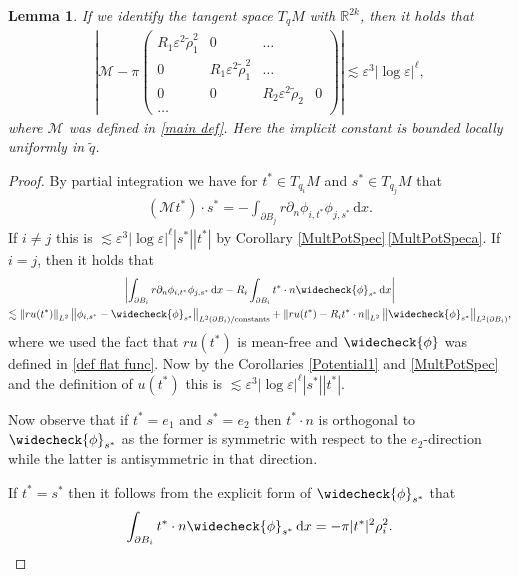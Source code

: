 \documentclass[JEP,XML,SOM,Unicode,published]{cedram}
\let\epsilon\varepsilon
\newcommand{\constants}{\textup{constants}}
\newtheorem{lemma}[theorem]{Lemma}
\theoremstyle{definition}
\newcommand\R{\mathbb{R}}
\newcommand\norm[1]{\left\lVert #1\right\rVert}
\newcommand\bnorm[1]{\bigl\lVert #1\bigr\rVert}
\newcommand\eq{=}
\newcommand\dd{\,\mathrm{d}}
\newcommand\dx{\dd x}
\let\chek\widecheck
\let\de\partial
\let\eps\epsilon
\begin{document}
\begin{lemma}\label{conv Inertia}
If we identify the tangent space $T_qM$ with $\R^{2k}$, then it holds that
\begin{align*}
\left|\mathcal{M}-\pi\begin{pmatrix}R_1\eps^2\tilde{\rho}_1^2 &0 &\dots\\0& R_1\eps^2\tilde{\rho}_1^2& \dots\\0& 0 & R_2\eps^2\tilde{\rho}_2 &0\\
\dots\end{pmatrix}\right|\lesssim \eps^3|{\log\eps}|^\ell,
\end{align*}
where $\mathcal{M}$ was defined in \ref{main def}.
Here the implicit constant is bounded locally uniformly in $\tilde{q}$.
\end{lemma}
\begin{proof}
By partial integration we have for $t^*\in T_{q_i}M$ and $s^*\in T_{q_j}M$ that
\begin{align*}
(\mathcal{M}t^*)\cdot s^*\eq-\int_{\de B_j}r \de_n\phi_{i,t^*}\phi_{j,s^*}\dx.
\end{align*}
If $i\neq j$ this is $\lesssim \eps^3|{\log\eps}|^\ell|s^*||t^*|$ by Corollary \ref{MultPotSpec}\,\eqref{MultPotSpeca}. If~$i=j$, then it holds that
\begin{multline*}
\left|\int_{\de B_i} r\de_n\phi_{i,t^*}\phi_{j,s^*}\dx-R_i\int_{\de B_i}t^*\cdot n\chek{\phi}_{s^*}\dx\right|\\
\lesssim \norm{ru(t^*)}_{L^2}\bnorm{\phi_{i,s^*}-\chek{\phi}_{s^*}}_{L^2(\de B_i)/\constants}+\norm{ru(t^*)-R_it^*\cdot n}_{L^2}\bnorm{\chek{\phi}_{s^*}}_{L^2(\de B_i)},
\end{multline*}
where we used the fact that $ru(t^*)$ is mean-free and $\chek{\phi}$ was defined in \ref{def flat func}. Now by the Corollaries \ref{Potential1} and \ref{MultPotSpec} and the definition of $u(t^*)$ this is $\lesssim \eps^3|{\log\eps}|^\ell|s^*||t^*|$.

Now observe that if $t^*=e_1$ and $s^*=e_2$ then $t^*\cdot n$ is orthogonal to $\chek{\phi}_{s^*}$ as the former is symmetric with respect to the $e_2$-direction while the latter is antisymmetric in that direction.

If $t^*=s^*$ then it follows from the explicit form of $\chek{\phi}_{s^*}$ that
\[
\int_{\de B_i}t^*\cdot n\chek{\phi}_{s^*}\dx\eq -\pi|t^*|^2\rho_i^2.\qedhere
\]
\end{proof}
\end{document}
